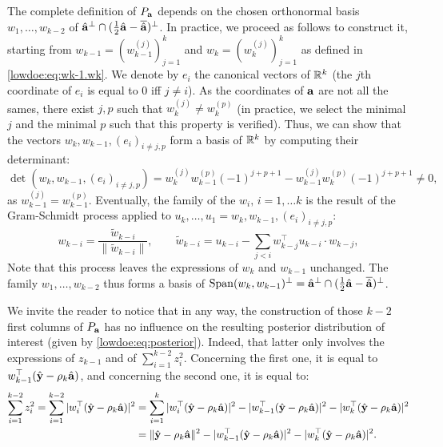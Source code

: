 {The complete definition of $P_{\mathbf{a}}$ depends on the chosen orthonormal basis $w_1,\dots,w_{k-2}$ of $\hat{\mathbf{a}}^\perp\cap(\frac{1}{2}\hat{\mathbf{a}}-\overline{\hat{\mathbf{a}}})^\perp$.
In practice, we proceed as follows to construct it, starting from $w_{k-1}=(w_{k-1}^{(j)})_{j=1}^k$ and $w_k=(w_k^{(j)})_{j=1}^k$ as defined in \cref{lowdoe:eq:wk-1.wk}. 
We denote by $e_i$ the canonical vectors of $\mathbb{R}^k$ (the $j$th coordinate of $e_i$ is equal to $0$ iff $j\ne i$). As the coordinates of $\mathbf{a}$ are not all the sames, there exist $j,p$ such that $w_{k}^{(j)}\ne w_{k}^{(p)}$ (in practice, we select the minimal $j$ and the minimal $p$ such that this property is verified). Thus, we can show that the vectors $w_k,w_{k-1},(e_i)_{i\ne j,p}$ form a basis of $\mathbb{R}^k$ by computing their determinant:
    \begin{equation}
        \det(w_k,w_{k-1},(e_i)_{i\ne j,p}) = w_k^{(j)}w_{k-1}^{(p)}(-1)^{j+p+1} - w_{k-1}^{(j)}w_k^{(p)}(-1)^{j+p+1}\ne 0,
    \end{equation}
as $w_{k-1}^{(j)}=w_{k-1}^{(p)}$.
Eventually, the family of the $w_i,\,i=1,\dots k$ is the result of the Gram-Schmidt process applied to $u_k,\dots,u_1=w_k,w_{k-1},(e_i)_{i\ne j,p}$: 
    \begin{equation}
        w_{k-i} = \frac{\tilde w_{k-i}}{\|\tilde w_{k-i}\|},\qquad \tilde w_{k-i} = u_{k-i} - \sum_{j<i} w_{k-j}^{\top}u_{k-i}\cdot w_{k-j}, 
    \end{equation}
Note that this process leaves the expressions of $w_k$ and $w_{k-1}$ unchanged. The family $w_1,\dots,w_{k-2}$ thus forms a basis of $\operatorname{Span}(w_k,w_{k-1})^\perp=\hat{\mathbf{a}}^\perp\cap(\frac{1}{2}\hat{\mathbf{a}}-\overline{\hat{\mathbf{a}}})^\perp$.

We invite the reader to notice that in any way, the construction of those $k-2$ first columns of $P_{\mathbf{a}}$ has no influence on the resulting posterior distribution of interest (given by \cref{lowdoe:eq:posterior}). Indeed, that latter only involves the expressions of $z_{k-1}$ and of $\sum_{i=1}^{k-2}z_i^2$. Concerning the first one, it is equal to $w_{k-1}^{\top}(\hat{\mathbf{y}}-\rho_k\hat{\mathbf{a}})$, and concerning the second one, it is equal to:
    \begin{align*}
            \sum_{i=1}^{k-2}z_i^2=\sum_{i=1}^{k-2}|w_i^{\top}(\hat{\mathbf{y}}-\rho_k\hat{\mathbf{a}})|^2&=\sum_{i=1}^{k}|w_i^{\top}(\hat{\mathbf{y}}-\rho_k\hat{\mathbf{a}})|^2-|w_{k-1}^{\top}(\hat{\mathbf{y}}-\rho_k\hat{\mathbf{a}} )|^2-|w_k^{\top}(\hat{\mathbf{y}}-\rho_k\hat{\mathbf{a}} )|^2\\
                &=\|\hat{\mathbf{y}}-\rho_k\hat{\mathbf{a}}\|^2-|w_{k-1}^{\top}(\hat{\mathbf{y}}-\rho_k\hat{\mathbf{a}} )|^2-|w_k^{\top}(\hat{\mathbf{y}}-\rho_k\hat{\mathbf{a}} )|^2.
        \end{align*}
    }


\newpage
\thispagestyle{plain}

